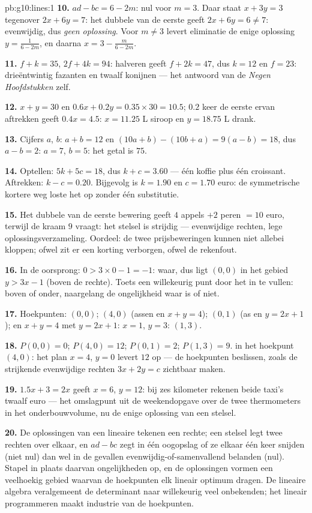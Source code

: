 \begin{solution}{pb:g10:lines:1}
\textbf{10.} $ad - bc = 6 - 2m$: nul voor $m = 3$. Daar staat $x + 3y = 3$
tegenover $2x + 6y = 7$: het dubbele van de eerste geeft
$2x + 6y = 6 \neq 7$: evenwijdig, dus \emph{geen oplossing}. Voor
$m \neq 3$ levert eliminatie de enige oplossing $y = \frac{1}{6 - 2m}$, en
daarna $x = 3 - \frac{m}{6 - 2m}$.

\textbf{11.} $f + k = 35$, $2f + 4k = 94$: halveren geeft $f + 2k = 47$, dus
$k = 12$ en $f = 23$: drieëntwintig fazanten en twaalf konijnen --- het
antwoord van de \emph{Negen Hoofdstukken} zelf.

\textbf{12.} $x + y = 30$ en $0.6x + 0.2y = 0.35 \times 30 = 10.5$; $0.2$
keer de eerste ervan aftrekken geeft $0.4x = 4.5$: $x = 11.25$ L siroop en
$y = 18.75$ L drank.

\textbf{13.} Cijfers $a$, $b$: $a + b = 12$ en
$(10a + b) - (10b + a) = 9(a - b) = 18$, dus $a - b = 2$: $a = 7$, $b = 5$:
het getal is $75$.

\textbf{14.} Optellen: $5k + 5c = 18$, dus $k + c = 3.60$ --- één koffie plus
één croissant. Aftrekken: $k - c = 0.20$. Bijgevolg is $k = 1.90$ en
$c = 1.70$ euro: de symmetrische kortere weg loste het op zonder één
substitutie.

\textbf{15.} Het dubbele van de eerste bewering geeft $4$ appels $+ 2$ peren
$= 10$ euro, terwijl de kraam $9$ vraagt: het stelsel is strijdig ---
evenwijdige rechten, lege oplossingsverzameling. Oordeel: de twee
prijsbeweringen kunnen niet allebei kloppen; ofwel zit er een korting
verborgen, ofwel de rekenfout.

\textbf{16.} In de oorsprong: $0 > 3 \times 0 - 1 = -1$: waar, dus ligt
$(0,0)$ in het gebied $y > 3x - 1$ (boven de rechte). Toets een willekeurig
punt door het in te vullen: boven of onder, naargelang de ongelijkheid waar
is of niet.

\textbf{17.} Hoekpunten: $(0, 0)$; $(4, 0)$ (assen en $x + y = 4$);
$(0, 1)$ (as en $y = 2x + 1$); en $x + y = 4$ met $y = 2x + 1$: $x = 1$,
$y = 3$: $(1, 3)$.

\textbf{18.} $P(0,0) = 0$; $P(4, 0) = 12$; $P(0, 1) = 2$; $P(1, 3) = 9$.
 in het hoekpunt $(4, 0)$: het plan $x = 4$, $y = 0$ levert $12$ op
--- de hoekpunten beslissen, zoals de strijkende evenwijdige rechten
$3x + 2y = c$ zichtbaar maken.

\textbf{19.} $1.5x + 3 = 2x$ geeft $x = 6$, $y = 12$: bij zes kilometer
rekenen beide taxi's twaalf euro --- het omslagpunt uit de weekendopgave over
de twee thermometers in het onderbouwvolume, nu de enige oplossing van een
stelsel.

\textbf{20.} De oplossingen van een lineaire  tekenen een rechte;
een stelsel legt twee rechten over elkaar, en $ad - bc$ zegt in één oogopslag
of ze elkaar één keer snijden (niet nul) dan wel in de gevallen
evenwijdig-of-samenvallend belanden (nul). Stapel in plaats daarvan
ongelijkheden op, en de oplossingen vormen een veelhoekig gebied waarvan de
hoekpunten elk lineair optimum dragen. De lineaire algebra veralgemeent de
determinant naar willekeurig veel onbekenden; het lineair programmeren maakt
industrie van de hoekpunten.
\end{solution}
